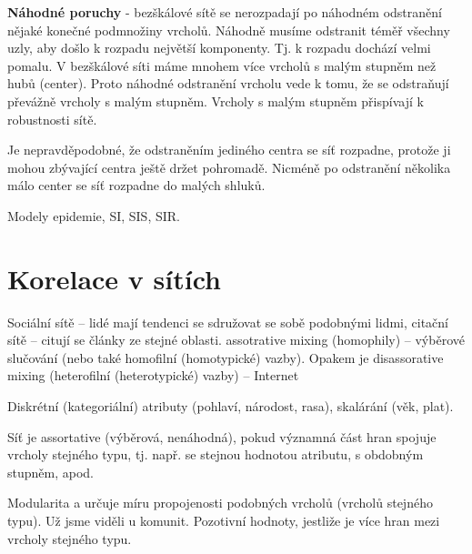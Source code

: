 \documentclass[a4paper,12pt]{article}
\begin{document}
\textbf{Náhodné poruchy} - bezškálové sítě se nerozpadají po náhodném odstranění nějaké konečné podmnožiny vrcholů. Náhodně musíme odstranit téměř
všechny uzly, aby došlo k rozpadu největší komponenty. Tj. k rozpadu dochází velmi pomalu. V bezškálové síti máme mnohem více vrcholů s malým stupněm než hubů (center). 
Proto náhodné odstranění vrcholu vede k tomu, že se odstraňují převážně vrcholy s malým stupněm.  Vrcholy s malým stupněm přispívají k robustnosti sítě.

Je nepravděpodobné, že odstraněním jediného centra se síť rozpadne, protože ji mohou zbývající centra ještě držet pohromadě. Nicméně po odstranění několika málo 
center se síť rozpadne do malých shluků.

Modely epidemie, SI, SIS, SIR.

\section{Korelace v sítích}
Sociální sítě – lidé mají tendenci se sdružovat se sobě podobnými lidmi, citační sítě – citují se články ze stejné oblasti.
assotrative mixing (homophily) – výběrové slučování (nebo také homofilní (homotypické) vazby). Opakem je disassorative mixing (heterofilní (heterotypické) vazby) – Internet

Diskrétní (kategoriální) atributy (pohlaví, národost, rasa), skalárání (věk, plat).

Síť je assortative (výběrová, nenáhodná), pokud významná část hran spojuje vrcholy stejného typu, tj. např. se stejnou hodnotou atributu, s obdobným stupněm, apod.

Modularita a určuje míru propojenosti podobných vrcholů (vrcholů stejného typu). Už jsme viděli u komunit. Pozotivní hodnoty, jestliže je více hran mezi vrcholy stejného 
typu.
\end{document}

